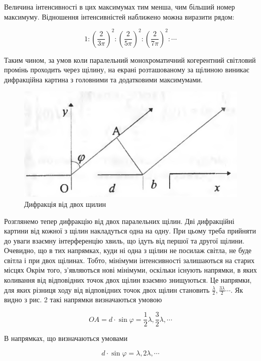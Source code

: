 Величина інтенсивності в цих максимумах тим менша, чим більший
номер максимуму. Відношення інтенсивністей наближено можна виразити рядом:

\begin{equation} \label{eq:8}
    1 : \left( \frac{2}{3 \pi} \right)^2 : 
    \left( \frac{2}{5 \pi} \right)^2 : 
    \left( \frac{2}{7 \pi} \right)^2 : \cdots
\end{equation}


Таким чином, за умов коли паралельний монохроматичний
когерентний світловий промінь проходить через щілину, на екрані
розташованому за щілиною виникає дифракційна картина з головними
та додатковими максимумами.

\begin{figure}    
    \centering
    \includegraphics[width=.5\textwidth]{assets/diffraction_in_two.png}
    \caption{Дифракція від двох щилин}
\end{figure}

Розглянемо тепер дифракцію від двох паралельних щілин.
Дві дифракційні картини від кожної з щілин накладуться одна на одну.
При цьому треба прийняти до уваги взаємну інтерференцію
хвиль, що ідуть від першої та другої щілини. Очевидно,
що в тих напрямках, куди ні одна з щілин не посилаж світла,
не буде світла і при двох щілинах. Тобто, мінімуми інтенсивності
залишаються на старих місцях Окрім того, з'являються нові
мінімуми, оскільки існують напрямки, в яких коливання від
відповідних точок двох щілин взаємно знищуються. Це напрямки, для яких
різниця ходу від відповідних точок двох щілин становить 
$\frac{\lambda}{2}, \frac{3 \lambda}{2} \cdots$. Як видно
з рис. 2 такі напрямки визначаються умовою

\begin{equation} \label{eq:9}
    OA = d \cdot \sin{\varphi} = \frac{1}{2} \lambda, \frac{3}{2} \lambda, \cdots
\end{equation}

В напрямках, що визначаються умовами 

\begin{equation} \label{eq:10}
    d \cdot \sin{\varphi} = \lambda, 2\lambda, \cdots
\end{equation}

